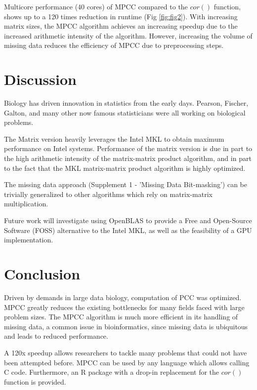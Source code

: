 \documentclass{bioinfo}
\begin{document}
Multicore performance (40 cores) of MPCC compared to the $cor()$
function, shows up to a 120 times reduction in runtime
(Fig \ref{fig:fig2}). With increasing matrix sizes, the MPCC algorithm
achieves an increasing speedup due to the increased arithmetic
intensity of the algorithm. However, increasing the volume of missing
data reduces the efficiency of MPCC due to preprocessing steps.

\vspace*{-5mm}
\section{Discussion}

Biology has driven innovation in statistics from the early
days. Pearson, Fischer, Galton, and many other now famous
statisticians were all working on biological problems.

The Matrix version heavily leverages the Intel\textregistered{} MKL to
obtain maximum performance on Intel\textregistered{}
systems. Performance of the matrix version is due in part to the high
arithmetic intensity of the matrix-matrix product algorithm, and in
part to the fact that the MKL matrix-matrix product algorithm is
highly optimized.

The missing data approach (Supplement 1 - 'Missing Data Bit-masking')
can be trivially generalized to other algorithms which rely on
matrix-matrix multiplication.

Future work will investigate using OpenBLAS to provide a Free and
Open-Source Software (FOSS) alternative to the Intel\textregistered{}
MKL, as well as the feasibility of a GPU implementation.
\vspace*{-5mm}

\section{Conclusion}

Driven by demands in large data biology, computation of PCC was
optimized.  MPCC greatly reduces the existing bottlenecks for many
fields faced with large problem sizes. The MPCC algorithm is much more
efficient in its handling of missing data, a common issue in
bioinformatics, since missing data is ubiquitous and leads to reduced
performance.

A 120x speedup allows researchers to tackle many problems that could
not have been attempted before. MPCC can be used by any language which
allows calling C code. Furthermore, an R package with a drop-in
replacement for the $cor()$ function is provided.
\end{document}
